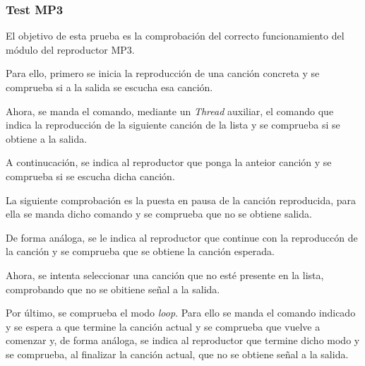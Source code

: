 \subsubsection{Test MP3}

El objetivo de esta prueba es la comprobación del correcto funcionamiento del módulo del reproductor MP3.

Para ello, primero se inicia la reproducción de una canción concreta y se comprueba si a la salida se escucha esa canción.

Ahora, se manda el comando, mediante un \textit{Thread} auxiliar, el comando que indica la reproducción de la siguiente canción de la lista y se comprueba si se obtiene a la salida.

A continucación, se indica al reproductor que ponga la anteior canción y se comprueba si se escucha dicha canción.

La siguiente comprobación es la puesta en pausa de la canción reproducida, para ella se manda dicho comando y se comprueba que no se obtiene salida.

De forma análoga, se le indica al reproductor que continue con la reproduccón de la canción y se comprueba que se obtiene la canción esperada.

Ahora, se intenta seleccionar una canción que no esté presente en la lista, comprobando que no se obitiene señal a la salida.

Por último, se comprueba el modo \textit{loop}. Para ello se manda el comando indicado y se espera a que termine la canción actual y se comprueba que vuelve a comenzar y, de forma análoga, se indica al reproductor que termine dicho modo y se comprueba, al finalizar la canción actual, que no se obtiene señal a la salida.